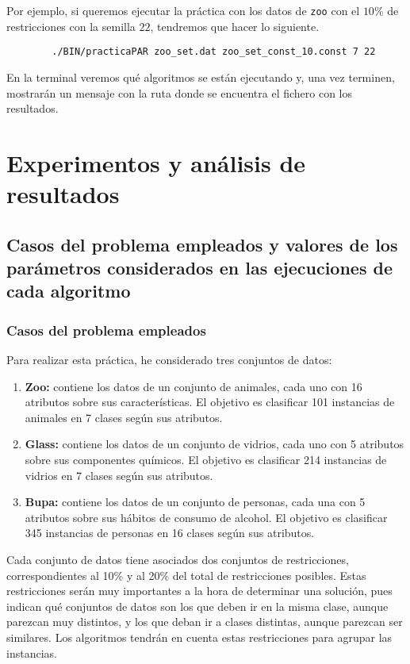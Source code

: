 			Por ejemplo, si queremos ejecutar la práctica con los datos de \lstinline!zoo! con el $10$\% de restricciones con la semilla $22$,
			tendremos que hacer lo siguiente.

		\footnotesize
		\begin{lstlisting}
		./BIN/practicaPAR zoo_set.dat zoo_set_const_10.const 7 22 
		\end{lstlisting}
		\normalsize

			En la terminal veremos qué algoritmos se están ejecutando y, una vez terminen, mostrarán un mensaje con la ruta donde se encuentra 
			el fichero con los resultados.
\newpage

\section{Experimentos y análisis de resultados}


\subsection{Casos del problema empleados y valores de los parámetros considerados en las ejecuciones de cada algoritmo}

\subsubsection{Casos del problema empleados}

Para realizar esta práctica, he considerado tres conjuntos de datos:

\begin{enumerate}
	\item \textbf{Zoo:} contiene los datos de un conjunto de animales, cada uno con 16 atributos sobre sus características. 
	El objetivo es clasificar 101 instancias de animales en 7 clases según sus atributos.
	\item \textbf{Glass:} contiene los datos de un conjunto de vidrios, cada uno con 5 atributos sobre sus componentes químicos.
	El objetivo es clasificar 214 instancias de vidrios en 7 clases según sus atributos.
	\item \textbf{Bupa:} contiene los datos de un conjunto de personas, cada una con 5 atributos sobre sus hábitos de consumo de alcohol.
	El objetivo es clasificar 345 instancias de personas en 16 clases según sus atributos.
\end{enumerate}

Cada conjunto de datos tiene asociados dos conjuntos de restricciones, correspondientes al 10\% y al 20\% 
del total de restricciones posibles. Estas restricciones serán muy importantes a la hora de determinar una solución,
pues indican qué conjuntos de datos son los que deben ir en la misma clase, aunque parezcan muy distintos, y los que deban ir a clases distintas, aunque parezcan ser similares.
Los algoritmos tendrán en cuenta estas restricciones para agrupar las instancias.

